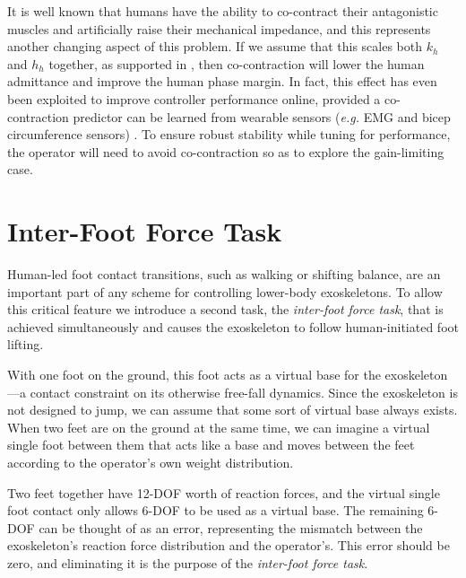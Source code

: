\documentclass[utf8]{frontiersSCNS}
\renewcommand*{\cite}[1]{\citep{#1}}
\newcommand{\add}[1]{\textcolor[HTML]{8710b3}{#1}}
\begin{document}
It is well known that humans have the ability to co-contract their antagonistic muscles and artificially raise their mechanical impedance, and this represents another changing aspect of this problem. If we assume that this scales both $k_h$ and $h_h$ together, as supported in \cite{HeHuangThomasSentis2020TNSRE}, then co-contraction will lower the human admittance and improve the human phase margin. \add{In fact, this effect has even been exploited to improve controller performance online, provided a co-contraction predictor can be learned from wearable sensors (\textit{e.g.} EMG and bicep circumference sensors) \cite{HuangCappelThomasHeSentis2020ACC}.} To ensure robust stability while tuning for performance, the operator will need to avoid co-contraction so as to explore the gain-limiting case. 


\section{Inter-Foot Force Task}\label{sec:ift}


Human-led foot contact transitions, such as walking or shifting balance, are an important part of any scheme for controlling lower-body exoskeletons. To allow this critical feature we introduce a second task, the \emph{inter-foot force task}, that is achieved simultaneously and  causes the exoskeleton to follow human-initiated foot lifting.


With one foot on the ground, this foot acts as a virtual base for the exoskeleton---a contact constraint on its otherwise free-fall dynamics.
Since the exoskeleton is not designed to jump, we can assume that some sort of virtual base always exists.
When two feet are on the ground at the same time,
we can imagine a virtual single foot between them that acts like a base and moves between the feet according to the operator's own weight distribution.

Two feet together have 12-DOF worth of reaction forces, and the virtual single foot contact only allows 6-DOF to be used as a virtual base.
The remaining 6-DOF can be thought of as an error, representing the mismatch between the exoskeleton's reaction force distribution and the operator's.
This error should be zero, and eliminating it is the purpose of the \emph{inter-foot force task}.
\end{document}
